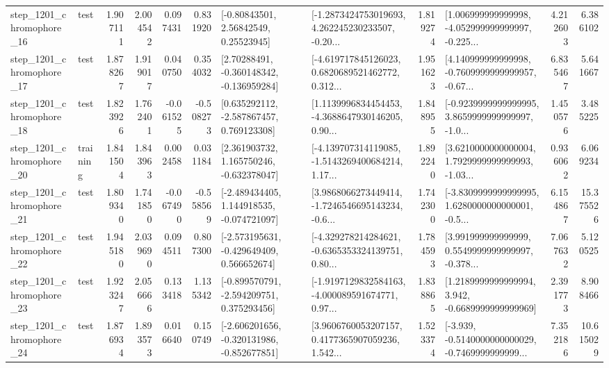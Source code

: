 \begin{tabular}{llrrrrllrlrr}
 step\_1201\_chromophore\_16 &      test &      1.907111 &    2.004542 &      0.097431 &  0.831920 &       [-0.80843501, 2.56842549, 0.25523945] &  [-1.2873424753019693, 4.262245230233507, -0.20... &       1.819274 &  [1.006999999999998, -4.052999999999997, -0.225... &            4.212603 &          6.386102 \\
 step\_1201\_chromophore\_17 &      test &      1.878267 &    1.919017 &      0.040750 &  0.354032 &    [2.70288491, -0.360148342, -0.136959284] &  [-4.619717845126023, 0.6820689521462772, 0.312... &       1.951623 &  [4.140999999999998, -0.7609999999999957, -0.67... &            6.835467 &          5.641667 \\
 step\_1201\_chromophore\_18 &      test &      1.823926 &    1.762401 &     -0.061525 & -0.508273 &    [0.635292112, -2.587867457, 0.769123308] &  [1.1139996834454453, -4.3688647930146205, 0.90... &       1.848955 &  [-0.9239999999999995, 3.8659999999999997, -1.0... &            1.450576 &          3.485225 \\
 step\_1201\_chromophore\_20 &  training &      1.841504 &    1.843963 &      0.002458 &  0.031184 &    [2.361903732, 1.165750246, -0.632378047] &  [-4.139707314119085, -1.5143269400684214, 1.17... &       1.892240 &  [3.6210000000000004, 1.7929999999999993, -1.03... &            0.936062 &          6.069234 \\
 step\_1201\_chromophore\_21 &      test &      1.809340 &    1.741850 &     -0.067490 & -0.558569 &   [-2.489434405, 1.144918535, -0.074721097] &  [3.9868066273449414, -1.7246546695143234, -0.6... &       1.742300 &  [-3.8309999999999995, 1.6280000000000001, -0.5... &            6.154867 &         15.375526 \\
 step\_1201\_chromophore\_22 &      test &      1.945180 &    2.039690 &      0.094511 &  0.807300 &   [-2.573195631, -0.429649409, 0.566652674] &  [-4.329278214284621, -0.6365353324139751, 0.80... &       1.784593 &  [3.991999999999999, 0.5549999999999997, -0.378... &            7.067632 &          5.120525 \\
 step\_1201\_chromophore\_23 &      test &      1.923247 &    2.056666 &      0.133418 &  1.135342 &   [-0.899570791, -2.594209751, 0.375293456] &  [-1.9197129832584163, -4.000089591674771, 0.97... &       1.838865 &   [1.2189999999999994, 3.942, -0.6689999999999969] &            2.391773 &          8.908466 \\
 step\_1201\_chromophore\_24 &      test &      1.876934 &    1.893573 &      0.016640 &  0.150749 &  [-2.606201656, -0.320131986, -0.852677851] &  [3.9606760053207157, 0.4177365907059236, 1.542... &       1.523374 &  [-3.939, -0.5140000000000029, -0.7469999999999... &            7.352186 &         10.615029 \\

\end{tabular}
